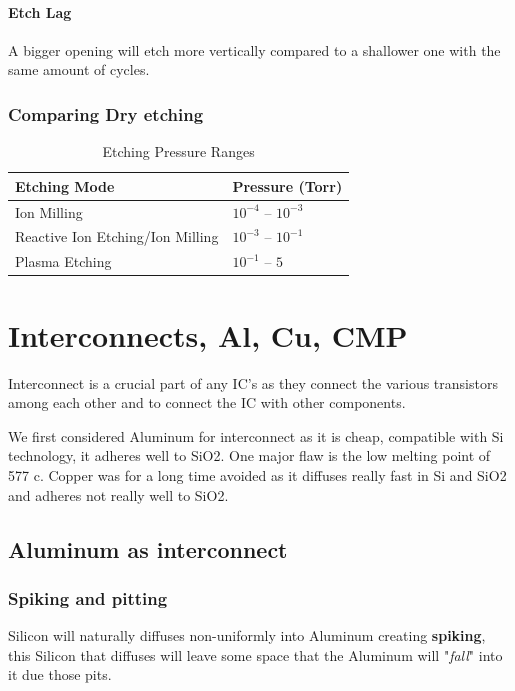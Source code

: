 \documentclass{report}
\begin{document}
\subsubsection{Etch Lag}

A bigger opening will etch more vertically compared to a shallower one with the same amount of cycles.

\subsection{Comparing Dry etching}

\begin{table}[H]
\centering
\begin{tabular}{|l|l|}
\hline
\textbf{Etching Mode} & \textbf{Pressure (Torr)} \\
\hline
Ion Milling & $10^{-4}$ -- $10^{-3}$ \\
Reactive Ion Etching/Ion Milling & $10^{-3}$ -- $10^{-1}$ \\
Plasma Etching & $10^{-1}$ -- $5$ \\
\hline
\end{tabular}
\caption{Etching Pressure Ranges}
\end{table}


\chapter{Interconnects, Al, Cu, CMP}

Interconnect is a crucial part of any IC's as they connect the various transistors among each other and to connect the IC with other components.

We first considered Aluminum for interconnect as it is cheap, compatible with Si technology, it adheres well to SiO2. One major flaw is the low melting point of 577 c. Copper was for a long time avoided as it diffuses really fast in Si and SiO2 and adheres not really well to SiO2.

\section{Aluminum as interconnect}

\subsection{Spiking and pitting}

Silicon will naturally diffuses non-uniformly into Aluminum creating \textbf{spiking}, this Silicon that diffuses will leave some space that the Aluminum will "\textit{fall}" into it due those pits.
\end{document}
